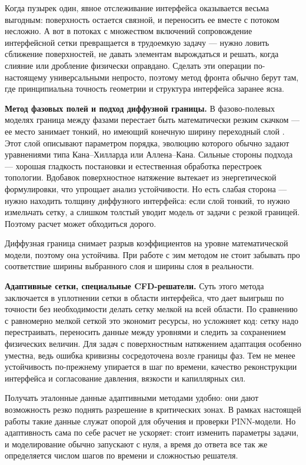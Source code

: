 Когда пузырек один, явное отслеживание интерфейса оказывается весьма выгодным:
поверхность остается связной, и переносить ее вместе с потоком несложно. А вот
в потоках с множеством включений сопровождение интерфейсной сетки превращается
в трудоемкую задачу --- нужно ловить сближение поверхностей, не давать
элементам вырождаться и решать, когда слияние или дробление физически
оправдано. Сделать эти операции по-настоящему универсальными непросто, поэтому
метод фронта обычно берут там, где принципиальна точность геометрии и структура
интерфейса заранее ясна.

\textbf{Метод фазовых полей и подход диффузной границы.}
В фазово-полевых моделях граница между фазами перестает быть математически
резким скачком --- ее место занимает тонкий, но имеющий конечную ширину
переходный слой \cite{Anderson1998}. Этот слой описывают параметром порядка,
эволюцию которого обычно задают уравнениями типа Кана--Хилларда или
Аллена--Кана. Сильные стороны подхода --- хорошая гладкость постановки и
естественная обработка перестроек топологии. Вдобавок поверхностное натяжение
вытекает из энергетической формулировки, что упрощает анализ устойчивости.
Но есть слабая сторона --- нужно находить толщину диффузного интерфейса:
если слой тонкий, то нужно измельчать сетку, а слишком толстый уводит модель
от задачи с резкой границей. Поэтому расчет может обходиться дорого.

Диффузная граница снимает разрыв коэффициентов на уровне математической модели, поэтому она устойчива. 
При работе с эим методом не стоит забывать про соответствие ширины выбранного слоя и ширины слоя в реальности.

\textbf{Адаптивные сетки, специальные CFD-решатели.}
Суть этого метода заключается в уплотнении сетки в области интерфейса, что дает выигрыш по точности без необходимости делать сетку мелкой на всей области.
По сравнению с равномерно мелкой сеткой это экономит ресурсы, но
усложняет код: сетку надо перестраивать, переносить данные между уровнями и
следить за сохранением физических величин. Для задач с поверхностным
натяжением адаптация особенно уместна, ведь ошибка кривизны сосредоточена возле
границы фаз. Тем не менее устойчивость по-прежнему упирается в шаг по времени,
качество реконструкции интерфейса и согласование давления, вязкости и
капиллярных сил.

Получать эталонные данные адаптивными методами удобно: они дают возможность
резко поднять разрешение в критических зонах. В рамках настоящей работы такие
данные служат опорой для обучения и проверки PINN-модели. Но адаптивность сама
по себе расчет не ускоряет: стоит изменить параметры задачи, и моделирование
обычно запускают с нуля, а время до ответа все так же определяется числом шагов
по времени и сложностью решателя.

